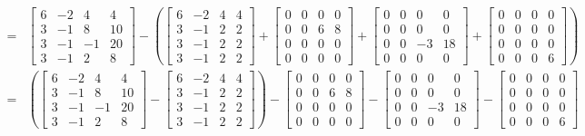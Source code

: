 \begin{tcolorbox}
\begin{align*}
    =& \left[\begin{array}{rrrr} 6 & -2 & 4 & 4\\ 3 & -1 & 8 & 10 \\ 3 & -1 & -1 & 20 \\ 3 & -1 & 2 & 8 \end{array}\right]  
    - \left( \left[\begin{array}{rrrr} 6 & -2 & 4 & 4\\ 3 & -1 & 2 & 2 \\ 3 & -1 & 2 & 2 \\ 3 & -1 & 2 & 2 \end{array}\right] + \left[\begin{array}{rrrr} 0 & 0 & 0 & 0\\ 0 & 0 & 6 & 8 \\ 0 & 0 & 0 & 0 \\ 0 &0 & 0 &0 \end{array}\right]  + \left[\begin{array}{rrrr} 0 & 0 & 0 & 0\\ 0 & 0 & 0 & 0 \\ 0 & 0 & -3 & 18 \\ 0 & 0 & 0 & 0 \end{array}\right] + \left[\begin{array}{rrrr} 0 & 0 & 0 & 0\\ 0 & 0 & 0 & 0 \\ 0 & 0 & 0 & 0 \\ 0 & 0 & 0 & 6 \end{array}\right] \right) \\ 
    =& \left( \left[\begin{array}{rrrr} 6 & -2 & 4 & 4\\ 3 & -1 & 8 & 10 \\ 3 & -1 & -1 & 20 \\ 3 & -1 & 2 & 8 \end{array}\right]  
    - \left[\begin{array}{rrrr} 6 & -2 & 4 & 4\\ 3 & -1 & 2 & 2 \\ 3 & -1 & 2 & 2 \\ 3 & -1 & 2 & 2 \end{array}\right] \right) - \left[\begin{array}{rrrr} 0 & 0 & 0 & 0\\ 0 & 0 & 6 & 8 \\ 0 & 0 & 0 & 0 \\ 0 &0 & 0 &0 \end{array}\right]  - \left[\begin{array}{rrrr} 0 & 0 & 0 & 0\\ 0 & 0 & 0 & 0 \\ 0 & 0 & -3 & 18 \\ 0 & 0 & 0 & 0 \end{array}\right] - \left[\begin{array}{rrrr} 0 & 0 & 0 & 0\\ 0 & 0 & 0 & 0 \\ 0 & 0 & 0 & 0 \\ 0 & 0 & 0 & 6 \end{array}\right]  \\ 

\end{align*}
\end{tcolorbox}

